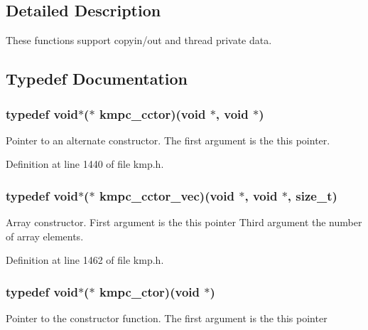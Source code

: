 \subsection{Detailed Description}
These functions support copyin/out and thread private data. 

\subsection{Typedef Documentation}
\hypertarget{group__THREADPRIVATE_gab6148c019e88c8853596bf5f516373b4}{
\subsubsection[{kmpc\-\_\-cctor}]{\setlength{\rightskip}{0pt plus 5cm}typedef {\bf void}$\ast$($\ast$ kmpc\-\_\-cctor)({\bf void} $\ast$, {\bf void} $\ast$)}}\label{group__THREADPRIVATE_gab6148c019e88c8853596bf5f516373b4}
Pointer to an alternate constructor. The first argument is the {\ttfamily this} pointer. 

Definition at line 1440 of file kmp.\-h.

\hypertarget{group__THREADPRIVATE_gaf9503cacabf6cf90ed34f2727fc480bc}{
\subsubsection[{kmpc\-\_\-cctor\-\_\-vec}]{\setlength{\rightskip}{0pt plus 5cm}typedef {\bf void}$\ast$($\ast$ kmpc\-\_\-cctor\-\_\-vec)({\bf void} $\ast$, {\bf void} $\ast$, size\-\_\-t)}}\label{group__THREADPRIVATE_gaf9503cacabf6cf90ed34f2727fc480bc}
Array constructor. First argument is the {\ttfamily this} pointer Third argument the number of array elements. 

Definition at line 1462 of file kmp.\-h.

\hypertarget{group__THREADPRIVATE_ga0c2f8074a8474eee42bc96a4bdc7679a}{
\subsubsection[{kmpc\-\_\-ctor}]{\setlength{\rightskip}{0pt plus 5cm}typedef {\bf void}$\ast$($\ast$ kmpc\-\_\-ctor)({\bf void} $\ast$)}}\label{group__THREADPRIVATE_ga0c2f8074a8474eee42bc96a4bdc7679a}
Pointer to the constructor function. The first argument is the {\ttfamily this} pointer 

